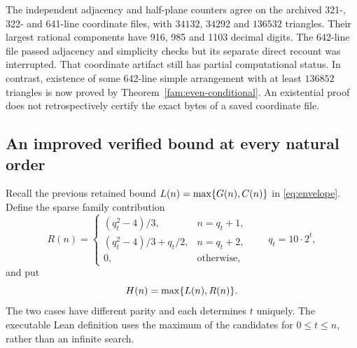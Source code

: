 The independent adjacency and half-plane counters agree on the archived
321-, 322- and 641-line coordinate files, with $34132$, $34292$ and
$136532$ triangles. Their largest rational components have 916, 985 and
1103 decimal digits. The 642-line file passed adjacency and simplicity
checks but its separate direct recount was interrupted. That coordinate
artifact still has partial computational status. In contrast, existence
of some 642-line simple arrangement with at least $136852$ triangles is
now proved by Theorem~\ref{fam:even-conditional}. An existential proof
does not retrospectively certify the exact bytes of a saved coordinate
file.

\subsection{An improved verified bound at every natural order}

Recall the previous retained bound $L(n)=\max\{G(n),C(n)\}$ in
\eqref{eq:envelope}. Define the sparse family contribution
\begin{equation}
 R(n)=\begin{cases}
 (q_t^2-4)/3,& n=q_t+1,\\
 (q_t^2-4)/3+q_t/2,& n=q_t+2,\\
 0,&\text{otherwise},
 \end{cases}
 \qquad q_t=10\cdot2^t,
 \label{fam:sparse-bound}
\end{equation}
and put
\begin{equation}
 H(n)=\max\{L(n),R(n)\}.
 \label{fam:new-envelope}
\end{equation}
The two cases have different parity and each determines $t$ uniquely.
The executable Lean definition uses the maximum of the candidates for
$0\le t\le n$, rather than an infinite search.

